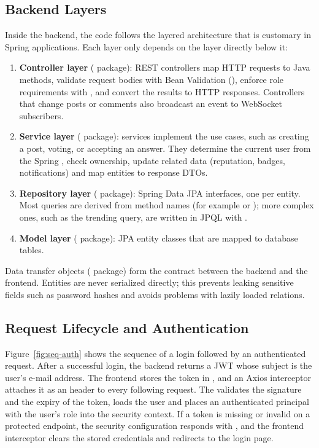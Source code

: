 \subsection{Backend Layers}

Inside the backend, the code follows the layered architecture that is customary in
Spring applications. Each layer only depends on the layer directly below it:

\begin{enumerate}
  \item \textbf{Controller layer} ( package): REST controllers map HTTP
    requests to Java methods, validate request bodies with Bean Validation
    (), enforce role requirements with , and convert the
    results to HTTP responses. Controllers that change posts or comments also broadcast
    an event to WebSocket subscribers.
  \item \textbf{Service layer} ( package): services implement the use
    cases, such as creating a post, voting, or accepting an answer. They determine the
    current user from the Spring , check ownership, update related
    data (reputation, badges, notifications) and map entities to response DTOs.
  \item \textbf{Repository layer} ( package): Spring Data JPA
    interfaces, one per entity. Most queries are derived from method names (for
    example  or
    ); more complex ones, such as the
    trending query, are written in JPQL with .
  \item \textbf{Model layer} ( package): JPA entity classes that are mapped
    to database tables.
\end{enumerate}

Data transfer objects ( package) form the contract between the backend and
the frontend. Entities are never serialized directly; this prevents leaking sensitive
fields such as password hashes and avoids problems with lazily loaded relations.

\subsection{Request Lifecycle and Authentication}

Figure~\ref{fig:seq-auth} shows the sequence of a login followed by an authenticated
request. After a successful login, the backend returns a JWT whose subject is the
user's e-mail address. The frontend stores the token in , and an
Axios interceptor attaches it as an  header to every
following request. The  validates the signature and the expiry of
the token, loads the user and places an authenticated principal with the user's role
into the security context. If a token is missing or invalid on a protected endpoint,
the security configuration responds with , and the frontend
interceptor clears the stored credentials and redirects to the login page.


